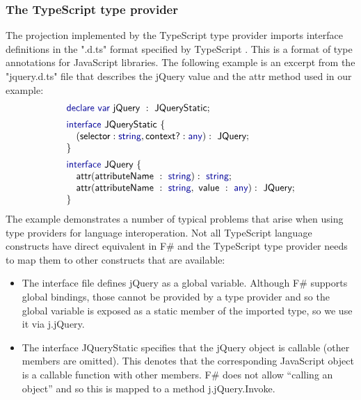 \documentclass[submission,copyright,creativecommons]{eptcs}
\newcommand{\kvd}[1]{\textnormal{\textcolor{kvdclr}{\sffamily #1}}}
\newcommand{\str}[1]{\textnormal{\textcolor{strclr}{\ttfamily "#1"}}}
\newcommand{\ident}[1]{\textnormal{\sffamily #1}}
\begin{document}
\subsubsection{The TypeScript type provider}
The projection implemented by the TypeScript type provider imports interface definitions in the
\str{.d.ts} format specified by TypeScript \cite{ms-typescript}. This is a format of type 
annotations for JavaScript libraries. The following example is an excerpt from the \str{jquery.d.ts}
file that describes the \ident{jQuery} value and the \ident{attr} method used in our example:
%
\begin{equation*}
\begin{array}{l}
 \kvd{declare var}~\ident{jQuery}~:~\ident{JQueryStatic}; 
\\[0.5em]
 \kvd{interface}~\ident{JQueryStatic}~\{ \\
 \quad (\ident{selector}: \kvd{string}, \ident{context?}: \kvd{any}):~\ident{JQuery}; \\
\} 
\\[0.5em]
\kvd{interface}~\ident{JQuery}~\{ \\
\quad \ident{attr}(\ident{attributeName}~:~\kvd{string}):~\kvd{string}; \\
\quad \ident{attr}(\ident{attributeName}~:~\kvd{string},~\ident{value}~:~\kvd{any}):~\ident{JQuery}; \\
\}
\end{array}
\end{equation*}
%
The example demonstrates a number of typical problems that arise when using type providers for
language interoperation. Not all TypeScript language constructs have direct equivalent in F\# and 
the TypeScript type provider needs to map them to other constructs that are available:
%
\begin{itemize}
\item The interface file defines \ident{jQuery} as a global variable. Although F\# supports
  global bindings, those cannot be provided by a type provider and so the global variable
  is exposed as a static member of the imported type, so we use it via \ident{j.jQuery}.

\item The interface \ident{JQueryStatic} specifies that the \ident{jQuery} object is callable
  (other members are omitted). This denotes that the corresponding JavaScript object is a
  callable function with other members. F\# does not allow ``calling an object'' and so 
  this is mapped to a method \ident{j.jQuery.Invoke}. 
\end{itemize}
\end{document}
